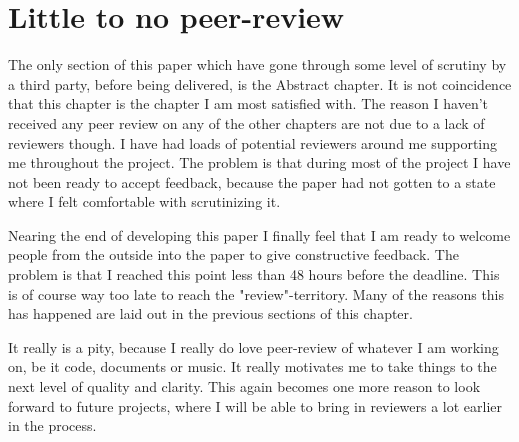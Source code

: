 \section{Little to no peer-review}

The only section of this paper which have gone through some level of scrutiny by a third party, before being delivered, is the Abstract chapter. It is not coincidence that this chapter is the chapter I am most satisfied with. The reason I haven't received any peer review on any of the other chapters are not due to a lack of reviewers though. I have had loads of potential reviewers around me supporting me throughout the project. The problem is that during most of the project I have not been ready to accept feedback, because the paper had not gotten to a state where I felt comfortable with scrutinizing it.

Nearing the end of developing this paper I finally feel that I am ready to welcome people from the outside into the paper to give constructive feedback. The problem is that I reached this point less than 48 hours before the deadline. This is of course way too late to reach the "review"-territory. Many of the reasons this has happened are laid out in the previous sections of this chapter.

It really is a pity, because I really do love peer-review of whatever I am working on, be it code, documents or music. It really motivates me to take things to the next level of quality and clarity. This again becomes one more reason to look forward to future projects, where I will be able to bring in reviewers a lot earlier in the process.